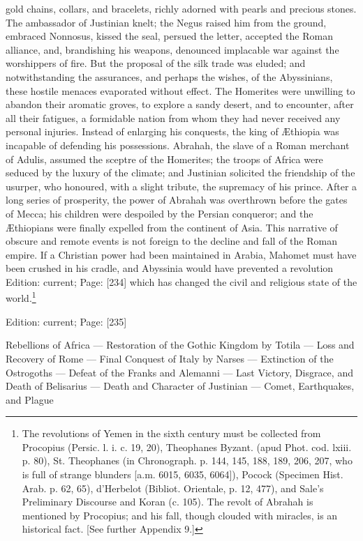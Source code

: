 gold chains, collars, and bracelets, richly adorned with pearls and precious stones. The ambassador of Justinian knelt; the Negus raised him from the ground, embraced Nonnosus, kissed the seal, persued the letter, accepted the Roman alliance, and, brandishing his weapons, denounced implacable war against the worshippers of fire. But the proposal of the silk trade was eluded; and notwithstanding the assurances, and perhaps the wishes, of the Abyssinians, these hostile menaces evaporated without effect. The Homerites were unwilling to abandon their aromatic groves, to explore a sandy desert, and to encounter, after all their fatigues, a formidable nation from whom they had never received any personal injuries. Instead of enlarging his conquests, the king of Æthiopia was incapable of defending his possessions. Abrahah, the slave of a Roman merchant of Adulis, assumed the sceptre of the Homerites; the troops of Africa were seduced by the luxury of the climate; and Justinian solicited the friendship of the usurper, who honoured, with a slight tribute, the supremacy of his prince. After a long series of prosperity, the power of Abrahah was overthrown before the gates of Mecca; his children were despoiled by the Persian conqueror; and the Æthiopians were finally expelled from the continent of Asia. This narrative of obscure and remote events is not foreign to the decline and fall of the Roman empire. If a Christian power had been maintained in Arabia, Mahomet must have been crushed in his cradle, and Abyssinia would have prevented a revolution Edition: current; Page: [234] which has changed the civil and religious state of the world.\footnote{The revolutions of Yemen in the sixth century must be collected from Procopius (Persic. l. i. c. 19, 20), Theophanes Byzant. (apud Phot. cod. lxiii. p. 80), St. Theophanes (in Chronograph. p. 144, 145, 188, 189, 206, 207, who is full of strange blunders [a.m. 6015, 6035, 6064]), Pocock (Specimen Hist. Arab. p. 62, 65), d\texthebrew{}’Herbelot (Bibliot. Orientale, p. 12, 477), and Sale\texthebrew{}’s Preliminary Discourse and Koran (c. 105). The revolt of Abrahah is mentioned by Procopius; and his fall, though clouded with miracles, is an historical fact. [See further Appendix 9.]}

Edition: current; Page: [235]


Rebellions of Africa \texthebrew{—} Restoration of the Gothic Kingdom by Totila \texthebrew{—} Loss and Recovery of Rome \texthebrew{—} Final Conquest of Italy by Narses \texthebrew{—} Extinction of the Ostrogoths \texthebrew{—} Defeat of the Franks and Alemanni \texthebrew{—} Last Victory, Disgrace, and Death of Belisarius \texthebrew{—} Death and Character of Justinian \texthebrew{—} Comet, Earthquakes, and Plague

